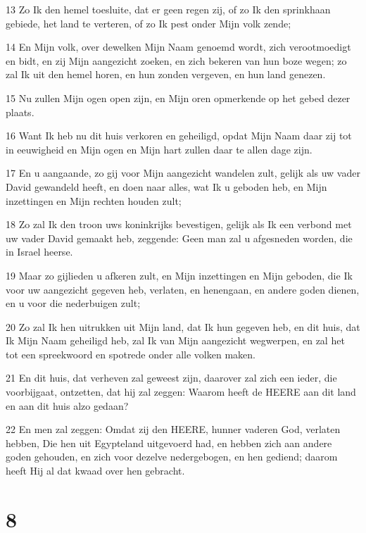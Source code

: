 \par 13 Zo Ik den hemel toesluite, dat er geen regen zij, of zo Ik den sprinkhaan gebiede, het land te verteren, of zo Ik pest onder Mijn volk zende;
\par 14 En Mijn volk, over dewelken Mijn Naam genoemd wordt, zich verootmoedigt en bidt, en zij Mijn aangezicht zoeken, en zich bekeren van hun boze wegen; zo zal Ik uit den hemel horen, en hun zonden vergeven, en hun land genezen.
\par 15 Nu zullen Mijn ogen open zijn, en Mijn oren opmerkende op het gebed dezer plaats.
\par 16 Want Ik heb nu dit huis verkoren en geheiligd, opdat Mijn Naam daar zij tot in eeuwigheid en Mijn ogen en Mijn hart zullen daar te allen dage zijn.
\par 17 En u aangaande, zo gij voor Mijn aangezicht wandelen zult, gelijk als uw vader David gewandeld heeft, en doen naar alles, wat Ik u geboden heb, en Mijn inzettingen en Mijn rechten houden zult;
\par 18 Zo zal Ik den troon uws koninkrijks bevestigen, gelijk als Ik een verbond met uw vader David gemaakt heb, zeggende: Geen man zal u afgesneden worden, die in Israel heerse.
\par 19 Maar zo gijlieden u afkeren zult, en Mijn inzettingen en Mijn geboden, die Ik voor uw aangezicht gegeven heb, verlaten, en henengaan, en andere goden dienen, en u voor die nederbuigen zult;
\par 20 Zo zal Ik hen uitrukken uit Mijn land, dat Ik hun gegeven heb, en dit huis, dat Ik Mijn Naam geheiligd heb, zal Ik van Mijn aangezicht wegwerpen, en zal het tot een spreekwoord en spotrede onder alle volken maken.
\par 21 En dit huis, dat verheven zal geweest zijn, daarover zal zich een ieder, die voorbijgaat, ontzetten, dat hij zal zeggen: Waarom heeft de HEERE aan dit land en aan dit huis alzo gedaan?
\par 22 En men zal zeggen: Omdat zij den HEERE, hunner vaderen God, verlaten hebben, Die hen uit Egypteland uitgevoerd had, en hebben zich aan andere goden gehouden, en zich voor dezelve nedergebogen, en hen gediend; daarom heeft Hij al dat kwaad over hen gebracht.

\chapter{8}


